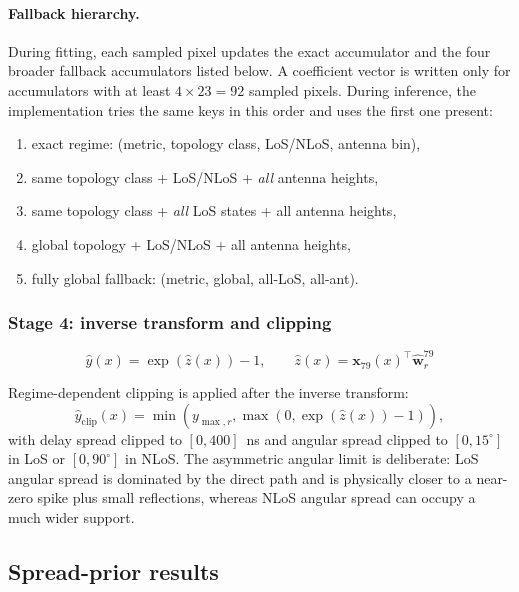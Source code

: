 \paragraph{Fallback hierarchy.} During fitting, each sampled pixel updates the
exact accumulator and the four broader fallback accumulators listed below. A
coefficient vector is written only for accumulators with at least
$4 \times 23 = 92$ sampled pixels. During inference, the implementation tries
the same keys in this order and uses the first one present:
\begin{enumerate}
\item exact regime: (metric, topology class, LoS/NLoS, antenna bin),
\item same topology class + LoS/NLoS + \emph{all} antenna heights,
\item same topology class + \emph{all} LoS states + all antenna heights,
\item global topology + LoS/NLoS + all antenna heights,
\item fully global fallback: (metric, global, all-LoS, all-ant).
\end{enumerate}

\subsubsection{Stage 4: inverse transform and clipping}

\begin{equation}
\hat y(x) = \exp\!\left(\hat z(x)\right) - 1,\qquad \hat z(x) = \textbf{x}_{79}(x)^\top \hat{\textbf{w}}^{79}_{r}
\label{eq:inv_log}
\end{equation}

Regime-dependent clipping is applied after the inverse transform:
\begin{equation}
\hat y_{\mathrm{clip}}(x)
=
\min\!\left(
y_{\max,r},
\max\!\left(0,\exp(\hat z(x))-1\right)
\right),
\label{eq:try79_clip}
\end{equation}
with delay spread clipped to $[0, 400]$~ns and angular spread clipped to
$[0, 15^\circ]$ in LoS or $[0, 90^\circ]$ in NLoS. The asymmetric angular
limit is deliberate: LoS angular spread is dominated by the direct path and is
physically closer to a near-zero spike plus small reflections, whereas NLoS
angular spread can occupy a much wider support.

\subsection{Spread-prior results}

